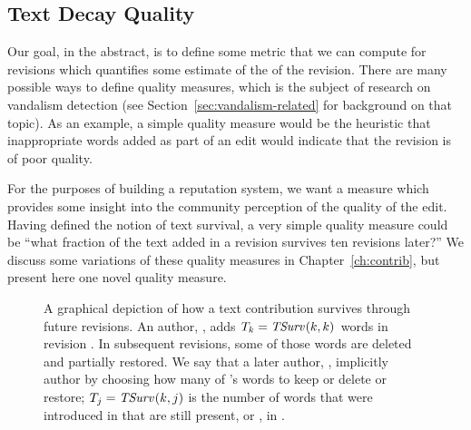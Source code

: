 \subsection{Text Decay Quality}

Our goal, in the abstract, is to define some metric that we can compute for
revisions which quantifies some estimate of the  of the
revision.
There are many possible ways to define quality measures, which is the
subject of research on vandalism detection (see
Section~\ref{sec:vandalism-related} for background on that topic).
As an example, a simple quality measure would be the heuristic that
inappropriate words added as part of an edit would indicate that the revision
is of poor quality.

For the purposes of building a reputation system, we want a measure
which provides some insight into the community perception of the
quality of the edit.
Having defined the notion of text survival, a very simple quality measure
could be ``what fraction of the text added in a revision survives
ten revisions later?''
We discuss some variations of these quality measures in
Chapter~\ref{ch:contrib}, but present here one novel quality measure.

\begin{figure}[htbp]
\centering
{}
\caption{A graphical depiction of how a text contribution survives
	through future revisions.
        An author, , adds
    $T_k = \mathit{TSurv}_{}(k,k)$ words in revision .  In subsequent
    revisions, some of those words are deleted and partially restored.
    We say that a later author, , implicitly 
    author  by choosing how many of 's words
    to keep or delete or restore; $T_j = \mathit{TSurv}_{}(k,j)$ is the number of words
    that were introduced in  that are still present, or
    , in .
}
\label{fig:textsurvival} 
\end{figure}


